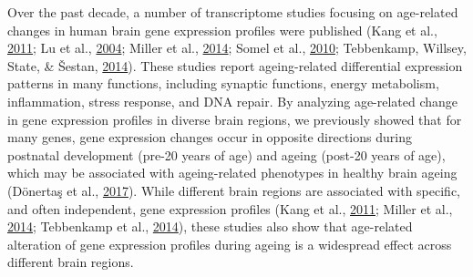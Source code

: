 \documentclass[12pt,twoside]{unicam}
\begin{document}
Over the past decade, a number of transcriptome studies focusing on age-related changes in human brain gene expression profiles were published (Kang et al., \protect\hyperlink{ref-Kang2011}{2011}; Lu et al., \protect\hyperlink{ref-Lu2004}{2004}; Miller et al., \protect\hyperlink{ref-Miller2014}{2014}; Somel et al., \protect\hyperlink{ref-Somel2010}{2010}; Tebbenkamp, Willsey, State, \& Šestan, \protect\hyperlink{ref-Tebbenkamp2014}{2014}). These studies report ageing-related differential expression patterns in many functions, including synaptic functions, energy metabolism, inflammation, stress response, and DNA repair. By analyzing age-related change in gene expression profiles in diverse brain regions, we previously showed that for many genes, gene expression changes occur in opposite directions during postnatal development (pre-20 years of age) and ageing (post-20 years of age), which may be associated with ageing-related phenotypes in healthy brain ageing (Dönertaş et al., \protect\hyperlink{ref-Donertas2017}{2017}). While different brain regions are associated with specific, and often independent, gene expression profiles (Kang et al., \protect\hyperlink{ref-Kang2011}{2011}; Miller et al., \protect\hyperlink{ref-Miller2014}{2014}; Tebbenkamp et al., \protect\hyperlink{ref-Tebbenkamp2014}{2014}), these studies also show that age-related alteration of gene expression profiles during ageing is a widespread effect across different brain regions.
\end{document}
